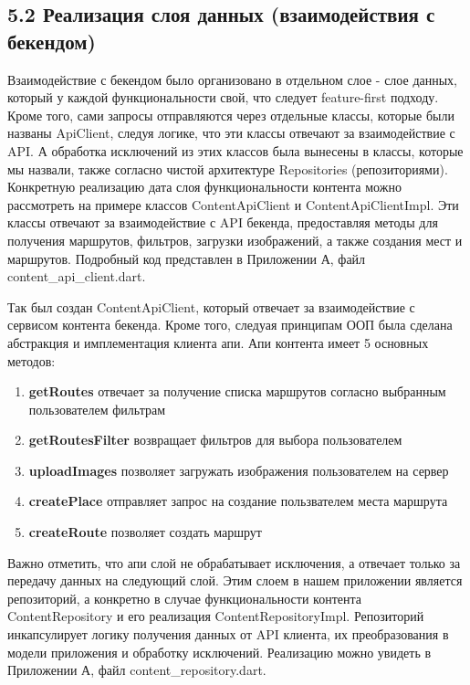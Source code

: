 \subsection*{5.2 Реализация слоя данных (взаимодействия с бекендом)}
Взаимодействие с бекендом было организовано в отдельном слое - слое данных, который у каждой функциональности свой, что следует feature-first подходу. Кроме того, сами запросы отправляются через отдельные классы, которые были названы ApiClient, следуя логике, что эти классы отвечают за взаимодействие с API. А обработка исключений из этих классов была вынесены в классы, которые мы назвали, также согласно чистой архитектуре Repositories (репозиториями). Конкретную реализацию дата слоя функциональности контента можно рассмотреть на примере классов ContentApiClient и ContentApiClientImpl. Эти классы отвечают за взаимодействие с API бекенда, предоставляя методы для получения маршрутов, фильтров, загрузки изображений, а также создания мест и маршрутов. Подробный код представлен в Приложении А, файл content\_api\_client.dart.

Так был создан ContentApiClient, который отвечает за взаимодействие с сервисом контента бекенда. Кроме того, следуая принципам ООП была сделана абстракция и имплементация клиента апи. Апи контента имеет 5 основных методов:

\begin{enumerate}
    \item \textbf{getRoutes} отвечает за получение списка маршрутов согласно выбранным пользователем фильтрам
    \item \textbf{getRoutesFilter} возвращает фильтров для выбора пользователем
    \item \textbf{uploadImages} позволяет загружать изображения пользователем на сервер
    \item \textbf{createPlace} отправляет запрос на создание пользвателем места маршрута
    \item \textbf{createRoute} позволяет создать маршрут
\end{enumerate}

\noindent Важно отметить, что апи слой не обрабатывает исключения, а отвечает только за передачу данных на следующий слой. Этим слоем в нашем приложении является репозиторий, а конкретно в случае функциональности контента ContentRepository и его реализация ContentRepositoryImpl. Репозиторий инкапсулирует логику получения данных от API клиента, их преобразования в модели приложения и обработку исключений. Реализацию можно увидеть в Приложении А, файл content\_repository.dart.


